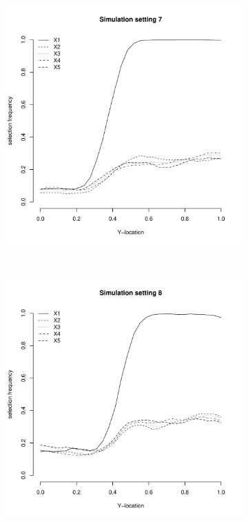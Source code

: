 \documentclass[authoryear, review, 11pt]{elsarticle}
\begin{document}
	
	\begin{figure}
		\centering
		\begin{subfigure}[b]{0.3\textwidth}
			\centering
			\includegraphics[width=\textwidth]{../../figures/simulation/28-7-profile-selection.pdf}
			\label{fig:gull}
		\end{subfigure}%
        ~ %
		\begin{subfigure}[b]{0.3\textwidth}
			\centering
			\includegraphics[width=\textwidth]{../../figures/simulation/28-8-profile-selection.pdf}

\end{subfigure}
\end{figure}
\end{document}
